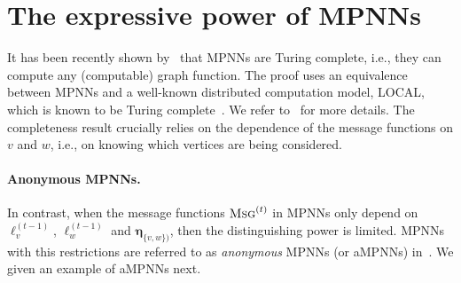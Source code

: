 \section{The expressive power of MPNNs}
It has been recently shown by~\cite{Loukas2019} that MPNNs are Turing complete, i.e., they can compute any (computable) graph function. The proof uses an equivalence between MPNNs and a well-known distributed computation model, LOCAL, which is known to be Turing complete~\cite{Angluin}. We refer to~\cite{Loukas2019} for more details. The completeness result crucially relies on the dependence of the message functions on $v$ and $w$, i.e., on knowing which vertices are being considered. 

\paragraph{Anonymous MPNNs.} In contrast, when the message functions 
$\textsc{Msg}^{(t)}$ in MPNNs only depend on $\pmb{\ell}_v^{(t-1)}$, $\pmb{\ell}_w^{(t-1)}$ and $\pmb{\eta}_{\{v,w\})}$, then the distinguishing power is limited. MPNNs with this restrictions are referred to as \textit{anonymous} MPNNs (or aMPNNs) in~\cite{Loukas2019}. We given an example of aMPNNs next.


